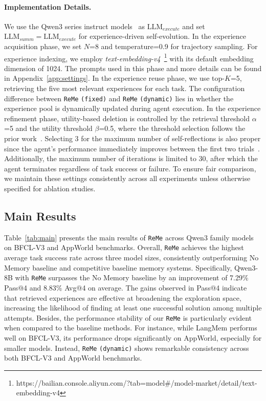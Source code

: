 \documentclass[11pt]{article}
\newcommand{\ours}{\texttt{ReMe}}
\begin{document}
\paragraph{Implementation Details.} 
We use the Qwen3 series instruct models~\citep{qwen3technicalreport} as $\text{LLM}_{execute}$ and set $\text{LLM}_{summ}=\text{LLM}_{execute}$ for experience-driven self-evolution. 
In the experience acquisition phase, we set $N$=8 and temperature=0.9 for trajectory sampling. 
For experience indexing, we employ \textit{text-embedding-v4}~\footnote{https://bailian.console.aliyun.com/?tab=model\#/model-market/detail/text-embedding-v4} with its default embedding dimension of 1024. 
The prompts used in this phase and more details can be found in Appendix~\ref{app:settings}. 
In the experience reuse phase, we use top-$K$=5, retrieving the five most relevant experiences for each task. 
The configuration difference between {\ours} \texttt{(fixed)} and {\ours} \texttt{(dynamic)} lies in whether the experience pool is dynamically updated during agent execution. 
In the experience refinement phase, utility-based deletion is controlled by the retrieval threshold $\alpha$=5 and the utility threshold $\beta$=0.5, where the threshold selection follows the prior work~\citep{xiong2025memory}. 
Selecting $3$ for the maximum number of self-reflections is also proper since the agent's performance immediately improves between the first two trials~\citep{shinn2023reflexion}. 
Additionally, the maximum number of iterations is limited to 30, after which the agent terminates regardless of task success or failure.
To ensure fair comparison, we maintain these settings consistently across all experiments unless otherwise specified for ablation studies. 

\subsection{Main Results} 
Table~\ref{tab:main} presents the main results of {\ours} across Qwen3 family models on BFCL-V3 and AppWorld benchmarks. 
Overall, {\ours} achieves the highest average task success rate across three model sizes, consistently outperforming No Memory baseline and competitive baseline memory systems. 
Specifically, Qwen3-8B with {\ours} surpasses the No Memory baseline by an improvement of 7.29\% Pass@4 and 8.83\% Avg@4 on average. 
The gains observed in Pass@4 indicate that retrieved experiences are effective at broadening the exploration space, increasing the likelihood of finding at least one successful solution among multiple attempts.
Besides, the performance stability of our {\ours} is particularly evident when compared to the baseline methods. 
For instance, while LangMem performs well on BFCL-V3, its performance drops significantly on AppWorld, especially for smaller models. 
Instead, {\ours} \texttt{(dynamic)} shows remarkable consistency across both BFCL-V3 and AppWorld benchmarks. 
\end{document}
